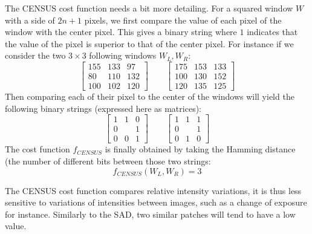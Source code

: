\begin{example}
	The CENSUS cost function needs a bit more detailing. For a squared window $W$ with a side of $2n+1$ pixels, we first compare the value of each pixel of the window with the center pixel. This gives a binary string where $1$ indicates that the value of the pixel is superior to that of the center pixel. For instance if we consider the two $3\times3$ following windows $W_L, W_R$:
	$$
    \begin{bmatrix}
        155 & 133 & 97 \\
        80 & 110 & 132 \\
        100 & 102 & 120
    \end{bmatrix}
    \qquad
    \begin{bmatrix}
        175 & 153 & 133 \\
        100 & 130 & 152 \\
        120 & 135 & 125
    \end{bmatrix}
	$$
	Then comparing each of their pixel to the center of the windows will yield the following binary strings (expressed here as matrices):
	$$
    \begin{bmatrix}
        1 & 1 & 0 \\
        0 &  & 1 \\
        0 & 0 & 1
    \end{bmatrix}
    \qquad
    \begin{bmatrix}
        1 & 1 & 1 \\
        0 &  & 1 \\
        0 & 1 & 0
    \end{bmatrix}
	$$
	The cost function $f_{CENSUS}$ is finally obtained by taking the Hamming distance (\ie the number of different bits between those two strings:
	\begin{equation*}
		f_{CENSUS}(W_L, W_R) = 3
	\end{equation*}
	
	The CENSUS cost function compares relative intensity variations, it is thus less sensitive to variations of intensities between images, such as a change of exposure for instance. Similarly to the SAD, two similar patches will tend to have a low value.
	

\end{example}
